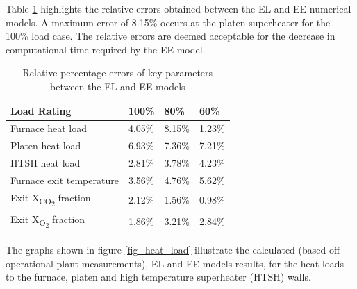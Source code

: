 \documentclass{webofc}
\begin{document}
Table \ref{tab_rel_err} highlights the relative errors obtained between the EL and EE numerical models. A maximum error of 8.15\% occurs at the platen superheater for the 100\% load case. The relative errors are deemed acceptable for the decrease in computational time required by the EE model.
\begin{table}[h!]
\centering
\caption{Relative percentage errors of key parameters between the EL and EE models}\label{tab_rel_err}       
\begin{tabular}{llll}
\hline
Load Rating & 100\% & 80\% & 60\%   \\
\hline
Furnace heat load & 4.05\% & 8.15\% & 1.23\%   \\
Platen heat load & 6.93\% & 7.36\% & 7.21\%   \\
HTSH heat load & 2.81\% & 3.78\% & 4.23\%  \\
Furnace exit temperature & 3.56\% & 4.76\% & 5.62\%  \\
Exit X\textsubscript{CO\textsubscript{2}} fraction & 2.12\% & 1.56\% & 0.98\% \\
Exit X\textsubscript{O\textsubscript{2}} fraction & 1.86\% &3.21\% & 2.84\%\\
\hline
\end{tabular}
\end{table}

The graphs shown in figure \ref{fig_heat_load} illustrate the calculated (based off operational plant measurements), EL and EE models results,  for the heat loads to the furnace, platen and high temperature superheater (HTSH) walls.
\end{document}
